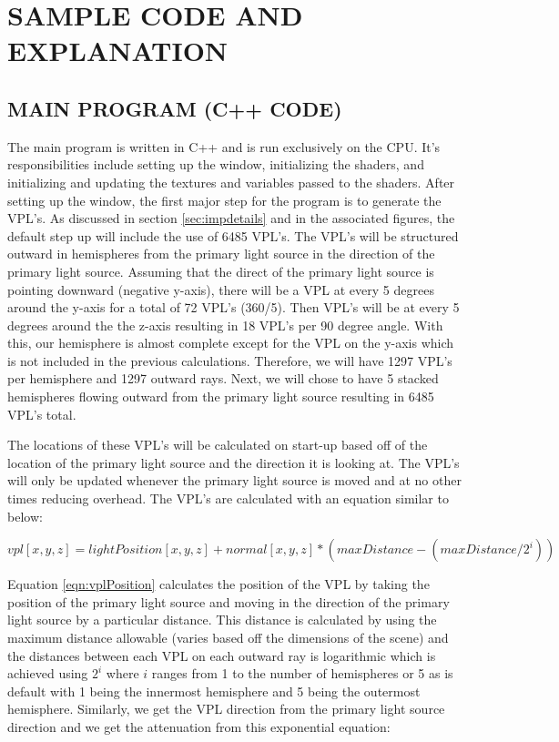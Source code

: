 \chapter{SAMPLE CODE AND EXPLANATION}

\section{MAIN PROGRAM (C++ CODE)}

The main program is written in C++ and is run exclusively on the CPU.  It's responsibilities include setting up the window, initializing the shaders, and initializing and updating the textures and variables passed to the shaders.  After setting up the window, the first major step for the program is to generate the VPL's.  As discussed in section \ref{sec:impdetails} and in the associated figures, the default step up will include the use of 6485 VPL's.  The VPL's will be structured outward in hemispheres from the primary light source in the direction of the primary light source.  Assuming that the direct of the primary light source is pointing downward (negative y-axis), there will be a VPL at every 5 degrees around the y-axis for a total of 72 VPL's (360/5).  Then VPL's will be at every 5 degrees around the the z-axis resulting in 18 VPL's per 90 degree angle.  With this, our hemisphere is almost complete except for the VPL on the y-axis which is not included in the previous calculations. Therefore, we will have 1297 VPL's per hemisphere and 1297 outward rays.  Next, we will chose to have 5 stacked hemispheres flowing outward from the primary light source resulting in 6485 VPL's total.  

The locations of these VPL's will be calculated on start-up based off of the location of the primary light source and the direction it is looking at.  The VPL's will only be updated whenever the primary light source is moved and at no other times reducing overhead.  The VPL's are calculated with an equation similar to below:

\begin{equation}
vpl[x,y,z] = lightPosition[x,y,z] + normal[x,y,z]*(maxDistance - (maxDistance/2^i)) \label{eqn:vplPosition}
\end{equation}

Equation \ref{eqn:vplPosition} calculates the position of the VPL by taking the position of the primary light source and moving in the direction of the primary light source by a particular distance.  This distance is calculated by using the maximum distance allowable (varies based off the dimensions of the scene) and the distances between each VPL on each outward ray is logarithmic which is achieved using $2^i$ where $i$ ranges from 1 to the number of hemispheres or 5 as is default with 1 being the innermost hemisphere and 5 being the outermost hemisphere.  Similarly, we get the VPL direction from the primary light source direction and we get the attenuation from this exponential equation:

